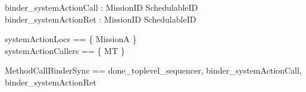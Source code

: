 

\begin{circus}

\circchannel binder\_systemActionCall :  MissionID  \cross SchedulableID  \\
\circchannel binder\_systemActionRet : MissionID  \cross SchedulableID  \\
\end{circus}
%
\begin{zed}
systemActionLocs == \{ MissionA \}  \\
systemActionCallers == \{ MT \}
\end{zed}
%

\begin{circus}
\circchannelset MethodCallBinderSync == \lchanset done\_toplevel\_sequencer,
binder\_systemActionCall, binder\_systemActionRet

\rchanset
\end{circus}
